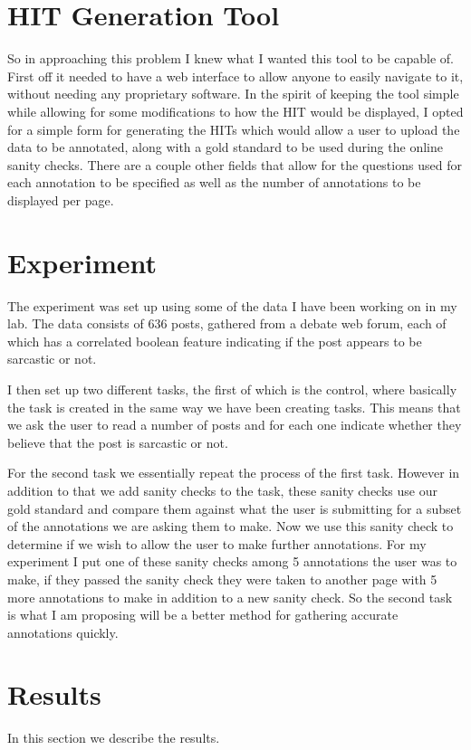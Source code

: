 \documentclass[11pt]{article}
\begin{document}
\section{HIT Generation Tool}\label{tool}
So in approaching this problem I knew what I wanted this tool to be capable of.  First off it needed to have a web interface to allow anyone to easily navigate to it, without needing any proprietary software.  In the spirit of keeping the tool simple while allowing for some modifications to how the HIT would be displayed, I opted for a simple form for generating the HITs which would allow a user to upload the data to be annotated, along with a gold standard to be used during the online sanity checks.  There are a couple other fields that allow for the questions used for each annotation to be specified as well as the number of annotations to be displayed per page.



\section{Experiment}\label{experiment}
The experiment was set up using some of the data I have been working on in my lab.  The data consists of 636 posts, gathered from a debate web forum, each of which has a correlated boolean feature indicating if the post appears to be sarcastic or not.  

I then set up two different tasks, the first of which is the control, where basically the task is created in the same way we have been creating tasks.  This means that we ask the user to read a number of posts and for each one indicate whether they believe that the post is sarcastic or not.

For the second task we essentially repeat the process of the first task.  However in addition to that we add sanity checks to the task, these sanity checks use our gold standard and compare them against what the user is submitting for a subset of the annotations we are asking them to make.  Now we use this sanity check to determine if we wish to allow the user to make further annotations.  For my experiment I put one of these sanity checks among 5 annotations the user was to make, if they passed the sanity check they were taken to another page with 5 more annotations to make in addition to a new sanity check.  So the second task is what I am proposing will be a better method for gathering accurate annotations quickly.  

\section{Results}\label{results}
In this section we describe the results.
\end{document}
